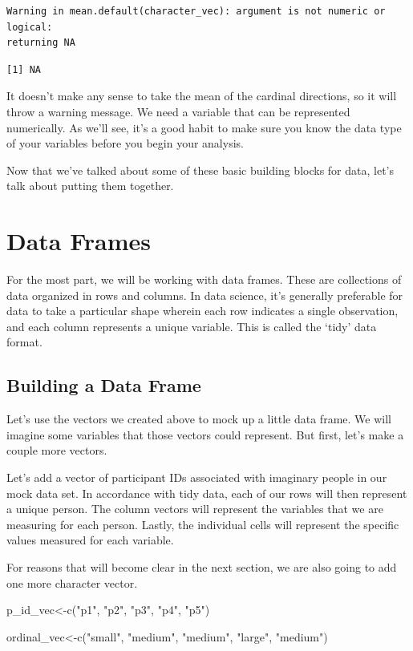 \documentclass[
  letterpaper,
  DIV=11,
  numbers=noendperiod]{scrreprt}
\newenvironment{Shaded}{\begin{snugshade}}{\end{snugshade}}
\newcommand{\FunctionTok}[1]{\textcolor[rgb]{0.28,0.35,0.67}{#1}}
\newcommand{\NormalTok}[1]{\textcolor[rgb]{0.00,0.23,0.31}{#1}}
\newcommand{\OtherTok}[1]{\textcolor[rgb]{0.00,0.23,0.31}{#1}}
\newcommand{\StringTok}[1]{\textcolor[rgb]{0.13,0.47,0.30}{#1}}
\begin{document}
\begin{verbatim}
Warning in mean.default(character_vec): argument is not numeric or logical:
returning NA
\end{verbatim}

\begin{verbatim}
[1] NA
\end{verbatim}

It doesn't make any sense to take the mean of the cardinal directions,
so it will throw a warning message. We need a variable that can be
represented numerically. As we'll see, it's a good habit to make sure
you know the data type of your variables before you begin your analysis.

Now that we've talked about some of these basic building blocks for
data, let's talk about putting them together.

\section{Data Frames}\label{data-frames}

For the most part, we will be working with data frames. These are
collections of data organized in rows and columns. In data science, it's
generally preferable for data to take a particular shape wherein each
row indicates a single observation, and each column represents a unique
variable. This is called the `tidy' data format.

\subsection{Building a Data Frame}\label{building-a-data-frame}

Let's use the vectors we created above to mock up a little data frame.
We will imagine some variables that those vectors could represent. But
first, let's make a couple more vectors.

Let's add a vector of participant IDs associated with imaginary people
in our mock data set. In accordance with tidy data, each of our rows
will then represent a unique person. The column vectors will represent
the variables that we are measuring for each person. Lastly, the
individual cells will represent the specific values measured for each
variable.

For reasons that will become clear in the next section, we are also
going to add one more character vector.

\begin{Shaded}
\begin{Highlighting}[]
\NormalTok{p\_id\_vec}\OtherTok{\textless{}{-}}\FunctionTok{c}\NormalTok{(}\StringTok{"p1"}\NormalTok{, }\StringTok{"p2"}\NormalTok{, }\StringTok{"p3"}\NormalTok{, }\StringTok{"p4"}\NormalTok{, }\StringTok{"p5"}\NormalTok{)}

\NormalTok{ordinal\_vec}\OtherTok{\textless{}{-}}\FunctionTok{c}\NormalTok{(}\StringTok{"small"}\NormalTok{, }\StringTok{"medium"}\NormalTok{, }\StringTok{"medium"}\NormalTok{, }\StringTok{"large"}\NormalTok{, }\StringTok{"medium"}\NormalTok{)}
\end{Highlighting}
\end{Shaded}
\end{document}
